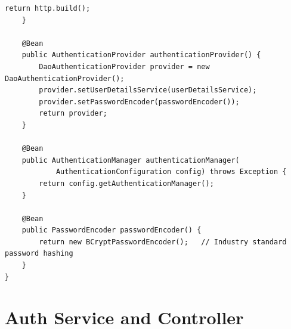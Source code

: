 \documentclass[12pt,a4paper]{report}
\begin{document}
\begin{lstlisting}[caption=SecurityConfig.java -- Production Security Configuration]
        return http.build();
    }

    @Bean
    public AuthenticationProvider authenticationProvider() {
        DaoAuthenticationProvider provider = new DaoAuthenticationProvider();
        provider.setUserDetailsService(userDetailsService);
        provider.setPasswordEncoder(passwordEncoder());
        return provider;
    }

    @Bean
    public AuthenticationManager authenticationManager(
            AuthenticationConfiguration config) throws Exception {
        return config.getAuthenticationManager();
    }

    @Bean
    public PasswordEncoder passwordEncoder() {
        return new BCryptPasswordEncoder();   // Industry standard password hashing
    }
}
\end{lstlisting}

\section{Auth Service and Controller}
\end{document}

